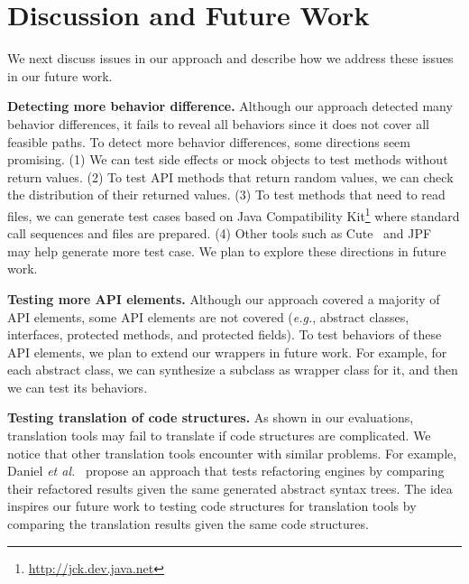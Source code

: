 

\section{Discussion and Future Work}
\label{sec:discuss}

We next discuss issues in our approach and describe how we address
these issues in our future work.

\textbf{Detecting more behavior difference.} Although our approach detected many behavior differences, it fails to reveal all behaviors since it does not cover all feasible paths. To detect more behavior differences, some directions seem promising. (1) We can test side effects or  mock objects to test methods without return values. (2) To test API methods that return random values, we can check the distribution of their returned values. (3) To test methods that need to read files, we can generate test cases based on Java Compatibility Kit\footnote{\url{http://jck.dev.java.net}} where standard call sequences and files are prepared. (4) Other tools such as Cute~\cite{koushik:cute} and JPF~\cite{visser2003mcp} may help generate more test case. We plan to explore these directions in future work.

\textbf{Testing more API elements.} Although our approach covered a majority of API elements, some API elements are not covered (\emph{e.g.}, abstract classes, interfaces, protected methods, and protected fields). To test behaviors of these API elements, we plan to extend our wrappers in future work. For example, for each abstract class, we can synthesize a subclass as wrapper class for it, and then we can test its behaviors.

\textbf{Testing translation of code structures.} As shown in our evaluations, translation tools may fail to translate if code structures are complicated. We notice that other translation tools encounter with similar problems. For example, Daniel \emph{et al.}~\cite{daniel2007automated} propose an approach that tests refactoring engines by comparing their refactored results given the same generated abstract syntax trees. The idea inspires our future work to testing code structures for translation tools by comparing the translation results given the same code structures.


